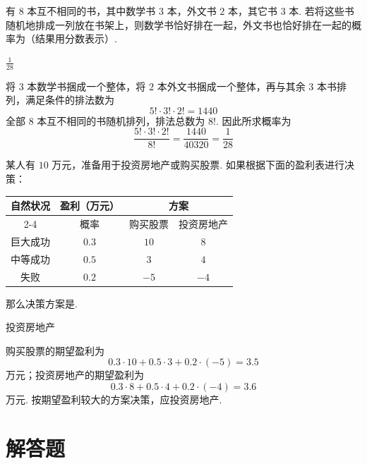 \documentclass[UTF8,a4paper,oneside,11pt]{ctexbook}
\begin{document}
\begin{problem}[B]
有 \(8\) 本互不相同的书，其中数学书 \(3\) 本，外文书 \(2\) 本，其它书 \(3\) 本. 若将这些书随机地排成一列放在书架上，则数学书恰好排在一起，外文书也恰好排在一起的概率为\fillinblank{}（结果用分数表示）.
\end{problem}

\begin{answer}
\(\frac{1}{28}\)
\end{answer}

\begin{solution}
将 \(3\) 本数学书捆成一个整体，将 \(2\) 本外文书捆成一个整体，再与其余 \(3\) 本书排列，满足条件的排法数为
\[
5!\cdot3!\cdot2!=1440
\]
全部 \(8\) 本互不相同的书随机排列，排法总数为 \(8!\). 因此所求概率为
\[
\frac{5!\cdot3!\cdot2!}{8!}
=\frac{1440}{40320}
=\frac{1}{28}
\]
\end{solution}

\begin{problem}[B]
某人有 \(10\) 万元，准备用于投资房地产或购买股票. 如果根据下面的盈利表进行决策：

\begin{center}
\begin{tabular}{|c|c|c|c|}
\hline
\multirow{2}{*}{自然状况} & 盈利（万元） & \multicolumn{2}{c|}{方案} \\
\cline{2-4}
 & 概率 & 购买股票 & 投资房地产 \\
\hline
巨大成功 & \(0.3\) & \(10\) & \(8\) \\
\hline
中等成功 & \(0.5\) & \(3\) & \(4\) \\
\hline
失败 & \(0.2\) & \(-5\) & \(-4\) \\
\hline
\end{tabular}
\end{center}

那么决策方案是\fillinblank{}.
\end{problem}

\begin{answer}
投资房地产
\end{answer}

\begin{solution}
购买股票的期望盈利为
\[
0.3\cdot10+0.5\cdot3+0.2\cdot(-5)=3.5
\]
万元；投资房地产的期望盈利为
\[
0.3\cdot8+0.5\cdot4+0.2\cdot(-4)=3.6
\]
万元. 按期望盈利较大的方案决策，应投资房地产.
\end{solution}

\section{解答题}
\end{document}
